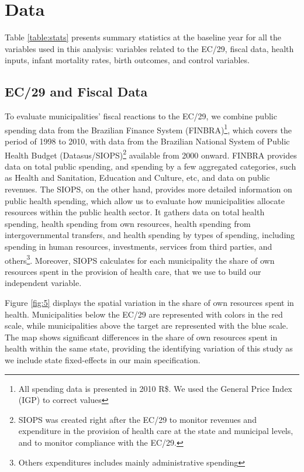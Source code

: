 \section{Data}\label{sec:data}

Table \ref{table:stats} presents summary statistics at the baseline year for all the variables used in this analysis: variables related to the EC/29, fiscal data, health inputs, infant mortality rates, birth outcomes, and control variables.

\subsection{EC/29 and Fiscal Data}

To evaluate municipalities' fiscal reactions to the EC/29, we combine public spending data from the Brazilian Finance System (FINBRA)\footnote{All spending data is presented in 2010 R\$. We used the General Price Index (IGP) to correct values}, which covers the period of 1998 to 2010, with data from the Brazilian National System of Public Health Budget (Datasus/SIOPS)\footnote{SIOPS was created right after the EC/29 to monitor revenues and expenditure in the provision of health care at the state and municipal levels, and to monitor compliance with the EC/29.} available from 2000 onward. FINBRA provides data on total public spending, and spending by a few aggregated categories, such as Health and Sanitation, Education and Culture, etc, and data on public revenues. The SIOPS, on the other hand, provides more detailed information on public health spending, which allow us to evaluate how municipalities allocate resources within the public health sector. It gathers data on total health spending, health spending from own resources, health spending from intergovernmental transfers, and health spending by types of spending, including spending in human resources, investments, services from third parties, and others\footnote{Others expenditures includes mainly administrative spending}. Moreover, SIOPS calculates for each municipality the share of own resources spent in the provision of health care, that we use to build our independent variable.

Figure \ref{fig:5} displays the spatial variation in the share of own resources spent in health. Municipalities below the EC/29 are represented with colors in the red scale, while municipalities above the target are represented with the blue scale. The map shows significant differences in the share of own resources spent in health within the same state, providing the identifying variation of this study as we include state fixed-effects in our main specification. 

